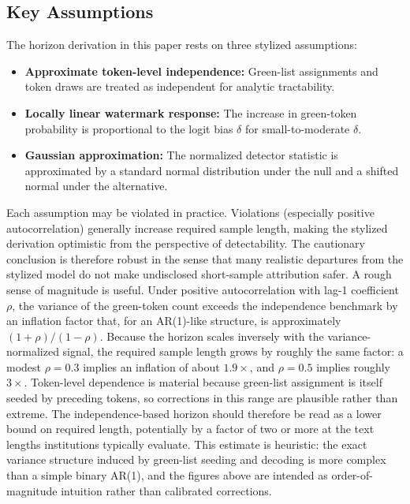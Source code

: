 \documentclass[11pt]{article}
\begin{document}
\subsection{Key Assumptions}
The horizon derivation in this paper rests on three stylized assumptions:
\begin{itemize}[leftmargin=2em]
\item \textbf{Approximate token-level independence:} Green-list assignments and
token draws are treated as independent for analytic tractability.
\item \textbf{Locally linear watermark response:} The increase in green-token
probability is proportional to the logit bias $\delta$ for small-to-moderate
$\delta$.
\item \textbf{Gaussian approximation:} The normalized detector statistic is
approximated by a standard normal distribution under the null and a shifted normal
under the alternative.
\end{itemize}
Each assumption may be violated in practice. Violations (especially positive
autocorrelation) generally increase required sample length, making the stylized
derivation optimistic from the perspective of detectability. The cautionary
conclusion is therefore robust in the sense that many realistic departures from
the stylized model do not make undisclosed short-sample attribution safer.
A rough sense of magnitude is useful. Under positive autocorrelation with lag-1
coefficient $\rho$, the variance of the green-token count exceeds the independence
benchmark by an inflation factor that, for an AR(1)-like structure, is
approximately $(1+\rho)/(1-\rho)$. Because the horizon scales inversely with the
variance-normalized signal, the required sample length grows by roughly the same
factor: a modest $\rho = 0.3$ implies an inflation of about $1.9\times$, and
$\rho = 0.5$ implies roughly $3\times$. Token-level dependence is material because
green-list assignment is itself seeded by preceding tokens, so corrections in this
range are plausible rather than extreme. The independence-based horizon should
therefore be read as a lower bound on required length, potentially by a factor of
two or more at the text lengths institutions typically evaluate. This estimate is
heuristic: the exact variance structure induced by green-list seeding and decoding
is more complex than a simple binary AR(1), and the figures above are intended as
order-of-magnitude intuition rather than calibrated corrections.
\end{document}
